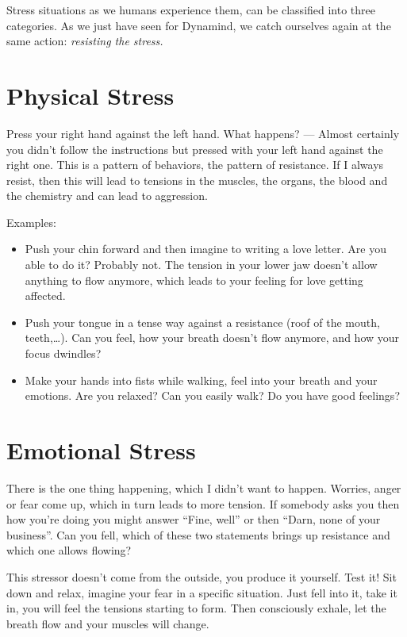 \documentclass[../main.tex]{subfiles}
\begin{document}
Stress situations as we humans experience them, can be classified into three categories.
As we just have seen for Dynamind, we catch ourselves again at the same action: \emph{resisting the stress.}

\section{Physical Stress}
Press your right hand against the left hand. What happens? ---
Almost certainly you didn't follow the instructions but pressed with your left hand against the right one.
This is a pattern of behaviors, the pattern of resistance.
If I always resist, then this will lead to tensions in the muscles, the organs, the blood and the chemistry and can lead to aggression.

Examples:
\begin{itemize}
\item Push your chin forward and then imagine to writing a love letter. Are you able to do it? Probably not.
  The tension in your lower jaw doesn't allow anything to flow anymore, which leads to your feeling for love getting affected.
\item Push your tongue in a tense way against a resistance (roof of the mouth, teeth,\ldots).
    Can you feel, how your breath doesn't flow anymore, and how your focus dwindles?
  \item Make your hands into fists while walking, feel into your breath and your emotions. Are you relaxed?
    Can you easily walk? Do you have good feelings?
  \end{itemize}

  \section{Emotional  Stress}

  There is the one thing happening, which I didn't want to happen.
  Worries, anger or fear come up, which in turn leads to more tension.
  If somebody asks you then how you're doing you might answer ``Fine, well'' or then ``Darn, none of your business''.
  Can you fell, which of these two statements brings up resistance and which one allows flowing?

  This stressor doesn't come from the outside, you produce it yourself.
  Test it!
  Sit down and relax, imagine your fear in a specific situation.
  Just fell into it, take it in, you will feel the tensions starting to form.
  Then consciously exhale, let the breath flow and your muscles will change.
\end{document}
